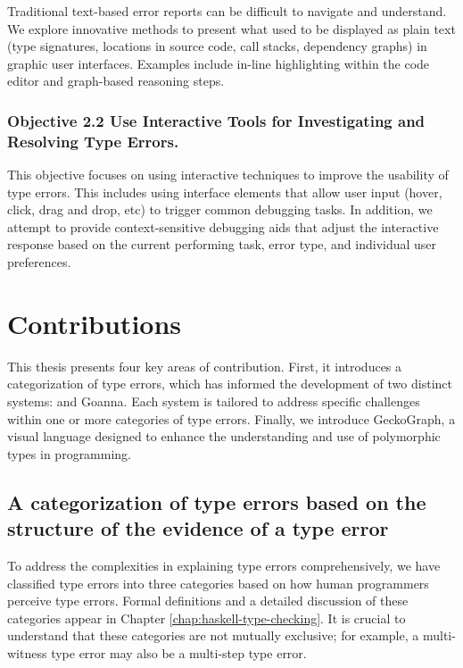 Traditional text-based error reports can be difficult to navigate and understand. We explore innovative methods to present what used to be displayed as plain text (type signatures, locations in source code, call stacks, dependency graphs) in graphic user interfaces. Examples include in-line highlighting within the code editor and graph-based reasoning steps.  

\subsubsection*{Objective 2.2 Use Interactive Tools for Investigating and Resolving Type Errors.}

This objective focuses on using interactive techniques to improve the usability of type errors.  This includes using interface elements that allow user input (hover, click, drag and drop, etc) to trigger common debugging tasks. In addition, we attempt to provide context-sensitive debugging aids that adjust the interactive response based on the current performing task, error type, and individual user preferences.


\section{Contributions}

This thesis presents four key areas of contribution. First, it introduces a categorization of type errors, which has informed the development of two distinct systems: \chameleon{} and Goanna. Each system is tailored to address specific challenges within one or more categories of type errors. Finally, we introduce GeckoGraph, a visual language designed to enhance the understanding and use of polymorphic types in programming.

\subsection*{A categorization of type errors based on the structure of the evidence of a type error}

To address the complexities in explaining type errors comprehensively, we have classified type errors into three categories based on how human programmers perceive type errors. Formal definitions and a detailed discussion of these categories appear in Chapter \ref{chap:haskell-type-checking}. It is crucial to understand that these categories are not mutually exclusive; for example, a multi-witness type error may also be a multi-step type error.

